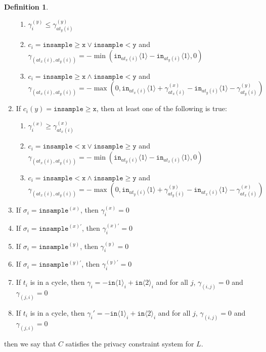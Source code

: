 \documentclass[12pt]{article}
\newcommand{\gguard}[1][x]{\texttt{insample}\geq #1}
\newcommand{\lguard}[1][x]{\texttt{insample} < #1}
\newcommand{\brangle}[1]{\langle #1 \rangle}
\theoremstyle{definition}
\newtheorem{defn}[thm]{Definition}
\begin{document}
\begin{defn}
\begin{enumerate}
\begin{enumerate}
            \item $\gamma_i^{(y)}\leq \gamma^{(y)}_{at_y(i)}$
            \item $c_i = \gguard[\texttt{x}]\lor\lguard[\texttt{y}]$ and $\gamma_{(at_x(i), at_y(i))} = -\min(\texttt{in}_{at_x(i)}\brangle{1}-\texttt{in}_{at_y(i)}\brangle{1}, 0)$
            \item $c_i = \gguard[\texttt{x}]\land\lguard[\texttt{y}]$ and $\gamma_{(at_x(i), at_y(i))} = -\max(0, \texttt{in}_{at_x(i)}\brangle{1}+ \gamma_{at_x(i)}^{(x)}-\texttt{in}_{at_y(i)}\brangle{1}-\gamma_{at_y(i)}^{(y)})$
        \end{enumerate}
        \item If $c_i(y) = \gguard[\texttt{x}]$, then at least one of the following is true: \begin{enumerate}
            \item $\gamma_i^{(x)}\geq \gamma^{(x)}_{at_x(i)}$
            \item $c_i = \lguard[\texttt{x}]\lor\gguard[\texttt{y}]$ and $\gamma_{(at_x(i), at_y(i))} = -\min(\texttt{in}_{at_y(i)}\brangle{1}-\texttt{in}_{at_x(i)}\brangle{1}, 0)$
            \item $c_i = \lguard[\texttt{x}]\land\gguard[\texttt{y}]$ and $\gamma_{(at_x(i), at_y(i))} = -\max(0, \texttt{in}_{at_y(i)}\brangle{1}+ \gamma_{at_y(i)}^{(y)}-\texttt{in}_{at_x(i)}\brangle{1}-\gamma_{at_x(i)}^{(x)})$
        \end{enumerate}
        \item If $\sigma_i = \texttt{insample}^{(x)}$, then $\gamma_i^{(x)}=0$
        \item If $\sigma_i = \texttt{insample}^{(x)\prime}$, then $\gamma_i^{(x)\prime}=0$
        \item If $\sigma_i = \texttt{insample}^{(y)}$, then $\gamma_i^{(y)}=0$
        \item If $\sigma_i = \texttt{insample}^{(y)\prime}$, then $\gamma_i^{(y)\prime}=0$
        \item If $t_i$ is in a cycle, then $\gamma_i = -\texttt{in}\brangle{1}_i+\texttt{in}\brangle{2}_i$ and for all $j$, $\gamma_{(i, j)} = 0$ and $\gamma_{(j, i)} = 0$
        \item If $t_i$ is in a cycle, then $\gamma_i' = -\texttt{in}\brangle{1}_i+\texttt{in}\brangle{2}_i$ and for all $j$, $\gamma_{(i, j)} = 0$ and $\gamma_{(j, i)} = 0$
    \end{enumerate}
    then we say that $C$ satisfies the privacy constraint system for $L$. 
\end{defn}
\end{document}
